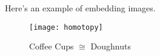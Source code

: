 \documentclass[../main.tex]{subfiles}
\begin{document}
Here's an example of embedding images.
 
\begin{figure}[bh]
    \centering
    \texttt{[image: homotopy]}
    \label{fig:img1}
    \caption{Coffee Cups $\cong$ Doughnuts}
\end{figure}
 
\end{document}
